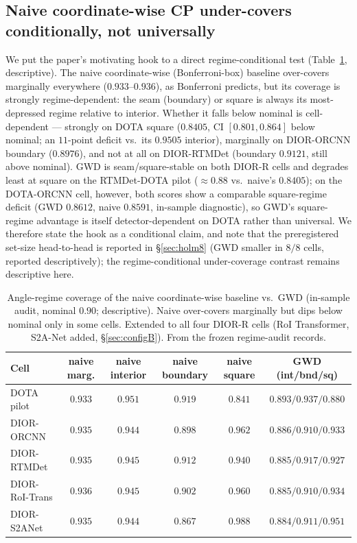 \documentclass[11pt]{article}
\begin{document}
\subsection{Naive coordinate-wise CP under-covers conditionally, not universally}
We put the paper's motivating hook to a direct regime-conditional test (Table~\ref{tab:naive}, descriptive).
The naive coordinate-wise (Bonferroni-box) baseline over-covers marginally everywhere
($0.933$--$0.936$), as Bonferroni predicts, but its coverage is strongly regime-dependent: the seam
(boundary) or square is always its most-depressed regime relative to interior. Whether it falls below
nominal is cell-dependent --- strongly on DOTA square ($0.8405$, CI $[0.801,0.864]$ below nominal; an $11$-point
deficit vs.\ its $0.9505$ interior), marginally on DIOR-ORCNN boundary ($0.8976$), and not at all on
DIOR-RTMDet (boundary $0.9121$, still above nominal). GWD is seam/square-stable on both DIOR-R cells and
degrades least at square on the RTMDet-DOTA pilot ($\approx0.88$ vs.\ naive's $0.8405$); on the DOTA-ORCNN
cell, however, both scores show a comparable square-regime deficit (GWD $0.8612$, naive $0.8591$,
in-sample diagnostic), so GWD's square-regime advantage is itself detector-dependent on DOTA rather than
universal. We therefore state the hook as a conditional claim, and note that the
preregistered set-size head-to-head is reported in \S\ref{sec:holm8} (GWD smaller in $8/8$ cells,
reported descriptively); the regime-conditional under-coverage contrast remains descriptive here.

\begin{table}[t]\centering\small
\caption{Angle-regime coverage of the naive coordinate-wise baseline vs.\ GWD (in-sample audit, nominal
$0.90$; descriptive). Naive over-covers marginally but dips below nominal only in some cells. Extended to all
four DIOR-R cells (RoI Transformer, S2A-Net added, \S\ref{sec:configB}). From the
frozen regime-audit records.}\label{tab:naive}
\begin{tabular}{lccccc}
\toprule
Cell & naive marg. & naive interior & naive boundary & naive square & GWD (int/bnd/sq) \\
\midrule
DOTA pilot        & $0.933$ & $0.951$ & $0.919$ & $0.841$ & $0.893/0.937/0.880$ \\
DIOR-ORCNN        & $0.935$ & $0.944$ & $0.898$ & $0.962$ & $0.886/0.910/0.933$ \\
DIOR-RTMDet       & $0.935$ & $0.945$ & $0.912$ & $0.940$ & $0.885/0.917/0.927$ \\
DIOR-RoI-Trans    & $0.936$ & $0.945$ & $0.902$ & $0.960$ & $0.885/0.910/0.934$ \\
DIOR-S2ANet       & $0.935$ & $0.944$ & $0.867$ & $0.988$ & $0.884/0.911/0.951$ \\
\bottomrule
\end{tabular}
\end{table}
\end{document}
